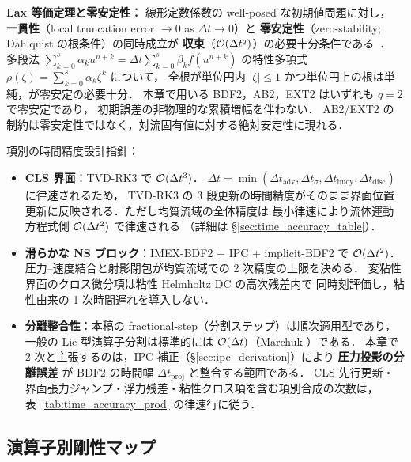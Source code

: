 \noindent\textbf{Lax 等価定理と零安定性：}
線形定数係数の well-posed な初期値問題に対し，
\textbf{一貫性}（local truncation error $\to 0$ as $\Delta t \to 0$）と
\textbf{零安定性}（zero-stability; Dahlquist の根条件）の同時成立が
\textbf{収束}（$\mathcal{O}(\Delta t^q)$）の必要十分条件である~\cite{HairerWanner1996}．
多段法 $\sum_{k=0}^{s}\alpha_k u^{n+k} = \Delta t \sum_{k=0}^{s}\beta_k f(u^{n+k})$
の特性多項式 $\rho(\zeta) = \sum_{k=0}^{s}\alpha_k \zeta^k$ について，
全根が単位円内 $|\zeta|\le 1$ かつ単位円上の根は単純，が零安定の必要十分．
本章で用いる BDF2，AB2，EXT2 はいずれも $q=2$ で零安定であり，
初期誤差の非物理的な累積増幅を伴わない．
AB2/EXT2 の制約は零安定性ではなく，対流固有値に対する絶対安定性に現れる．

項別の時間精度設計指針：

\begin{itemize}[leftmargin=2em]
  \item \textbf{CLS 界面}：TVD-RK3 で $\mathcal{O}(\Delta t^3)$．
        $\Delta t=\min(\Delta t_{\mathrm{adv}},\Delta t_\sigma,\Delta t_{\mathrm{buoy}},\Delta t_{\mathrm{disc}})$ に律速されるため，
        TVD-RK3 の 3 段更新の時間精度がそのまま界面位置更新に反映される．ただし均質流域の全体精度は
        最小律速により流体運動方程式側 $\mathcal{O}(\Delta t^2)$ で律速される
        （詳細は \S\ref{sec:time_accuracy_table}）．
  \item \textbf{滑らかな NS ブロック}：IMEX-BDF2 + IPC + implicit-BDF2 で $\mathcal{O}(\Delta t^2)$．
        圧力--速度結合と射影閉包が均質流域での 2 次精度の上限を決める．
        変粘性界面のクロス微分項は粘性 Helmholtz DC の高次残差内で
        同時刻評価し，粘性由来の 1 次時間遅れを導入しない．
  \item \textbf{分離整合性}：本稿の fractional-step（分割ステップ）は順次適用型であり，
        一般の Lie 型演算子分割は標準的には $\mathcal{O}(\Delta t)$（Marchuk \cite{Marchuk1990}）である．
        本章で 2 次と主張するのは，IPC 補正（\S\ref{sec:ipc_derivation}）により
        \textbf{圧力投影の分離誤差} が BDF2 の時間幅 $\Delta t_{\mathrm{proj}}$ と整合する範囲である．
        CLS 先行更新・界面張力ジャンプ・浮力残差・粘性クロス項を含む項別合成の次数は，
        表~\ref{tab:time_accuracy_prod} の律速行に従う．
\end{itemize}

\subsection{演算子別剛性マップ}
\label{sec:time_operator_stiffness}

